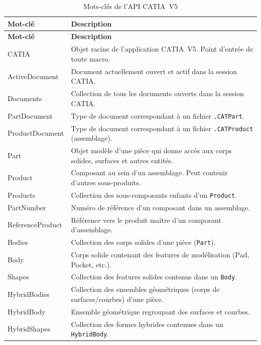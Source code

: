 \begin{longtable}{|>{\ttfamily}p{4.5cm}|p{11.5cm}|}
  \caption{Mots-clés de l'API CATIA~V5}\label{annex:catia-api} \\
  \hline
  \normalfont\textbf{Mot-clé} & \textbf{Description} \\
  \hline
  \endfirsthead
  \hline
  \normalfont\textbf{Mot-clé} & \textbf{Description} \\
  \hline
  \endhead
  \hline
  \endlastfoot
  CATIA & Objet racine de l'application CATIA~V5. Point d'entrée de toute macro. \\ \hline
  ActiveDocument & Document actuellement ouvert et actif dans la session CATIA. \\ \hline
  Documents & Collection de tous les documents ouverts dans la session CATIA. \\ \hline
  PartDocument & Type de document correspondant à un fichier \normalfont\texttt{.CATPart}. \\ \hline
  ProductDocument & Type de document correspondant à un fichier \normalfont\texttt{.CATProduct} (assemblage). \\ \hline
  Part & Objet modèle d'une pièce qui donne accès aux corps solides, surfaces et autres entités. \\ \hline
  Product & Composant au sein d'un assemblage. Peut contenir d'autres sous-produits. \\ \hline
  Products & Collection des sous-composants enfants d'un \normalfont\texttt{Product}. \\ \hline
  PartNumber & Numéro de référence d'un composant dans un assemblage. \\ \hline
  ReferenceProduct & Référence vers le produit maître d'un composant d'assemblage. \\ \hline
  Bodies & Collection des corps solides d'une pièce (\normalfont\texttt{Part}). \\ \hline
  Body & Corps solide contenant des features de modélisation (Pad, Pocket, etc.). \\ \hline
  Shapes & Collection des features solides contenus dans un \normalfont\texttt{Body}. \\ \hline
  HybridBodies & Collection des ensembles géométriques (corps de surfaces/courbes) d'une pièce. \\ \hline
  HybridBody & Ensemble géométrique regroupant des surfaces et courbes. \\ \hline
  HybridShapes & Collection des formes hybrides contenues dans un \normalfont\texttt{HybridBody}. \\ \hline

\end{longtable}
